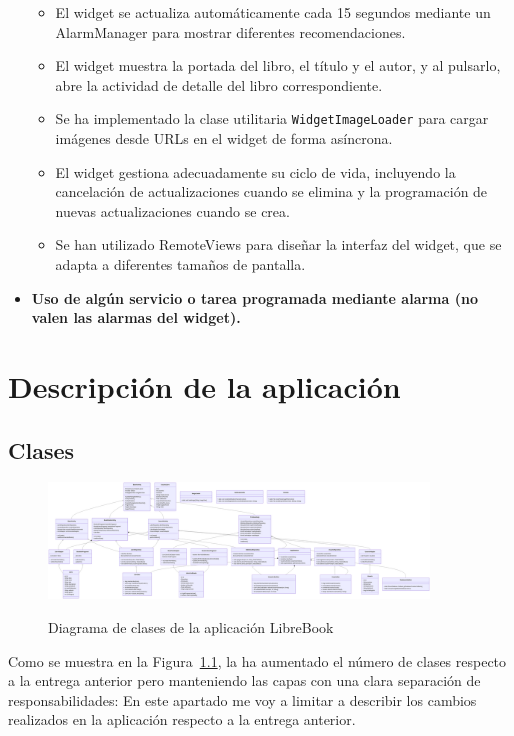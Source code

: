 \documentclass[a4paper,11pt]{report}
\begin{document}
\begin{itemize}
\begin{itemize}
            \item El widget se actualiza automáticamente cada 15 segundos mediante un AlarmManager para mostrar diferentes recomendaciones.
            \item El widget muestra la portada del libro, el título y el autor, y al pulsarlo, abre la actividad de detalle del libro correspondiente.
            \item Se ha implementado la clase utilitaria \texttt{WidgetImageLoader} para cargar imágenes desde URLs en el widget de forma asíncrona.
            \item El widget gestiona adecuadamente su ciclo de vida, incluyendo la cancelación de actualizaciones cuando se elimina y la programación de nuevas actualizaciones cuando se crea.
            \item Se han utilizado RemoteViews para diseñar la interfaz del widget, que se adapta a diferentes tamaños de pantalla.
          \end{itemize}
        \item \textbf{Uso de algún servicio o tarea programada mediante alarma (no valen las alarmas del widget).}
      \end{itemize}
  \chapter{Descripción de la aplicación}
    \section{Clases}
      \begin{figure}[H]
        \centering
        \href{https://raw.githubusercontent.com/Xabierland/DAS-Proyecto/refs/heads/main/Documentation/Memoria2/.img/diagrama-clases.svg}{%
          \includegraphics[width=0.9\textwidth]{.img/diagrama-clases.png}
        }
        \caption{Diagrama de clases de la aplicación LibreBook}
        \label{fig:diagrama-clases}
      \end{figure}
      Como se muestra en la Figura~\ref{fig:diagrama-clases}, la ha aumentado el número de clases respecto a la entrega anterior pero manteniendo las capas con una clara separación de responsabilidades\cite{android_architecture}:
      En este apartado me voy a limitar a describir los cambios realizados en la aplicación respecto a la entrega anterior.
\end{document}
